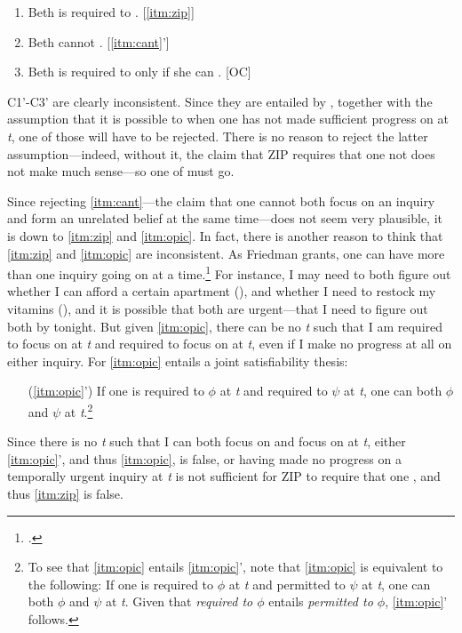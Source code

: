 \documentclass[12pt]{article}
\begin{document}
\begin{enumerate}[label=(C\arabic*'),ref=C\arabic*]
    \item Beth is required to \foc{}. [\ref*{itm:zip}]
    \item Beth cannot \foc{}. [\ref*{itm:cant}']
    \item Beth is required to \foc{} only if she can \foc{}. [OC]
\end{enumerate}
%
C1'-C3' are clearly inconsistent. Since they are entailed by \psub{}, together with the assumption that it is possible to \jud{} when one has not made sufficient progress on  at \textit{t}, one of those will have to be rejected. There is no reason to reject the latter assumption---indeed, without it, the claim that ZIP requires that one not \jud{} does not make much sense---so one of \psub{} must go.

Since rejecting \ref*{itm:cant}---the claim that one cannot both focus on an inquiry and form an unrelated belief at the same time---does not seem very plausible, it is down to \ref*{itm:zip} and \ref*{itm:opic}. In fact, there is another reason to think that \ref*{itm:zip} and \ref*{itm:opic} are inconsistent. As Friedman grants, one can have more than one inquiry going on at a time.\footnote{\textcite[10]{friedman_epistemic_nodate}.} For instance, I may need to both figure out whether I can afford a certain apartment (), and whether I need to restock my vitamins (), and it is possible that both are urgent---that I need to figure out both by tonight. But given \ref*{itm:opic}, there can be no \textit{t} such that I am required to focus on  at \textit{t} and required to focus on  at \textit{t}, even if I make no progress at all on either inquiry. For \ref*{itm:opic} entails a joint satisfiability thesis:

\begin{enumerate}
    \item[(\ref*{itm:opic}')] If one is required to $\phi$ at \textit{t} and required to $\psi$ at \textit{t}, one can both $\phi$ and $\psi$ at \textit{t}.\footnote{To see that \ref*{itm:opic} entails \ref*{itm:opic}', note that \ref*{itm:opic} is equivalent to the following: If one is required to $\phi$ at \textit{t} and permitted to $\psi$ at \textit{t}, one can both $\phi$ and $\psi$ at \textit{t}. Given that \textit{required to $\phi$} entails \textit{permitted to $\phi$}, \ref*{itm:opic}' follows.}
\end{enumerate}
%
Since there is no \textit{t} such that I can both focus on  and focus on  at \textit{t}, either \ref*{itm:opic}', and thus \ref*{itm:opic}, is false, or having made no progress on a temporally urgent inquiry  at \textit{t} is not sufficient for ZIP to require that one \foc{}, and thus \ref*{itm:zip} is false.
\end{document}

